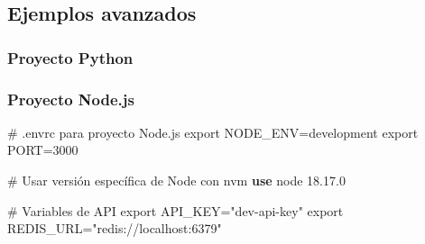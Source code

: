 \documentclass[
  11pt,
  letterpaper,
  oneside,
  openany]{scrbook}
\newenvironment{Shaded}{}{}
\newcommand{\BuiltInTok}[1]{\textcolor[rgb]{0.84,0.23,0.29}{#1}}
\newcommand{\CommentTok}[1]{\textcolor[rgb]{0.42,0.45,0.49}{#1}}
\newcommand{\ControlFlowTok}[1]{\textcolor[rgb]{0.84,0.23,0.29}{#1}}
\newcommand{\ExtensionTok}[1]{\textcolor[rgb]{0.84,0.23,0.29}{\textbf{#1}}}
\newcommand{\KeywordTok}[1]{\textcolor[rgb]{0.84,0.23,0.29}{#1}}
\newcommand{\NormalTok}[1]{\textcolor[rgb]{0.14,0.16,0.18}{#1}}
\newcommand{\OperatorTok}[1]{\textcolor[rgb]{0.14,0.16,0.18}{#1}}
\newcommand{\OtherTok}[1]{\textcolor[rgb]{0.44,0.26,0.76}{#1}}
\newcommand{\StringTok}[1]{\textcolor[rgb]{0.01,0.18,0.38}{#1}}
\newcommand{\VariableTok}[1]{\textcolor[rgb]{0.89,0.38,0.04}{#1}}
\begin{document}
\subsection{Ejemplos avanzados}\label{ejemplos-avanzados-2}

\subsubsection{Proyecto Python}\label{proyecto-python}

\begin{Shaded}
\end{Shaded}

\subsubsection{Proyecto Node.js}\label{proyecto-node.js}

\begin{Shaded}
\begin{Highlighting}[]
\CommentTok{\# .envrc para proyecto Node.js}
\BuiltInTok{export} \VariableTok{NODE\_ENV}\OperatorTok{=}\NormalTok{development}
\BuiltInTok{export} \VariableTok{PORT}\OperatorTok{=}\NormalTok{3000}

\CommentTok{\# Usar versión específica de Node con nvm}
\ExtensionTok{use}\NormalTok{ node 18.17.0}

\CommentTok{\# Variables de API}
\BuiltInTok{export} \VariableTok{API\_KEY}\OperatorTok{=}\StringTok{"dev{-}api{-}key"}
\BuiltInTok{export} \VariableTok{REDIS\_URL}\OperatorTok{=}\StringTok{"redis://localhost:6379"}
\end{Highlighting}
\end{Shaded}
\end{document}
